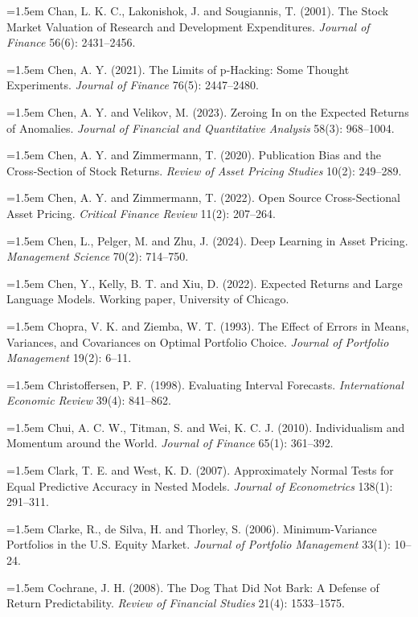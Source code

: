 \hangindent=1.5em Chan, L. K. C., Lakonishok, J. and Sougiannis, T. (2001). The Stock Market Valuation of Research and Development Expenditures. \emph{Journal of Finance} 56(6): 2431--2456.

\hangindent=1.5em Chen, A. Y. (2021). The Limits of p-Hacking: Some Thought Experiments. \emph{Journal of Finance} 76(5): 2447--2480.

\hangindent=1.5em Chen, A. Y. and Velikov, M. (2023). Zeroing In on the Expected Returns of Anomalies. \emph{Journal of Financial and Quantitative Analysis} 58(3): 968--1004.

\hangindent=1.5em Chen, A. Y. and Zimmermann, T. (2020). Publication Bias and the Cross-Section of Stock Returns. \emph{Review of Asset Pricing Studies} 10(2): 249--289.

\hangindent=1.5em Chen, A. Y. and Zimmermann, T. (2022). Open Source Cross-Sectional Asset Pricing. \emph{Critical Finance Review} 11(2): 207--264.

\hangindent=1.5em Chen, L., Pelger, M. and Zhu, J. (2024). Deep Learning in Asset Pricing. \emph{Management Science} 70(2): 714--750.

\hangindent=1.5em Chen, Y., Kelly, B. T. and Xiu, D. (2022). Expected Returns and Large Language Models. Working paper, University of Chicago.

\hangindent=1.5em Chopra, V. K. and Ziemba, W. T. (1993). The Effect of Errors in Means, Variances, and Covariances on Optimal Portfolio Choice. \emph{Journal of Portfolio Management} 19(2): 6--11.

\hangindent=1.5em Christoffersen, P. F. (1998). Evaluating Interval Forecasts. \emph{International Economic Review} 39(4): 841--862.

\hangindent=1.5em Chui, A. C. W., Titman, S. and Wei, K. C. J. (2010). Individualism and Momentum around the World. \emph{Journal of Finance} 65(1): 361--392.

\hangindent=1.5em Clark, T. E. and West, K. D. (2007). Approximately Normal Tests for Equal Predictive Accuracy in Nested Models. \emph{Journal of Econometrics} 138(1): 291--311.

\hangindent=1.5em Clarke, R., de Silva, H. and Thorley, S. (2006). Minimum-Variance Portfolios in the U.S. Equity Market. \emph{Journal of Portfolio Management} 33(1): 10--24.

\hangindent=1.5em Cochrane, J. H. (2008). The Dog That Did Not Bark: A Defense of Return Predictability. \emph{Review of Financial Studies} 21(4): 1533--1575.

